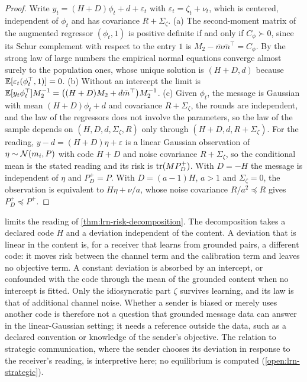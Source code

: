 \begin{proof}
Write $y_t=(H+D)\phi_t+d+\varepsilon_t$ with $\varepsilon_t=\zeta_t+\nu_t$, which is centered, independent of $\phi_t$ and has covariance $R+\Sigma_\zeta$. (a) The second-moment matrix of the augmented regressor $(\phi_t,1)$ is positive definite if and only if $C_\phi\succ0$, since its Schur complement with respect to the entry $1$ is $M_2-\bar m\bar m^\top=C_\phi$. By the strong law of large numbers the empirical normal equations converge almost surely to the population ones, whose unique solution is $(H+D,d)$ because $\mathbb{E}[\varepsilon_t(\phi_t^\top,1)]=0$. (b) Without an intercept the limit is $\mathbb{E}[y_t\phi_t^\top]M_2^{-1}=\bigl((H+D)M_2+d\bar m^\top\bigr)M_2^{-1}$. (c) Given $\phi_t$, the message is Gaussian with mean $(H+D)\phi_t+d$ and covariance $R+\Sigma_\zeta$, the rounds are independent, and the law of the regressors does not involve the parameters, so the law of the sample depends on $(H,D,d,\Sigma_\zeta,R)$ only through $(H+D,d,R+\Sigma_\zeta)$. For the reading, $y-d=(H+D)\eta+\varepsilon$ is a linear Gaussian observation of $\eta\sim\mathcal{N}(m_i,P)$ with code $H+D$ and noise covariance $R+\Sigma_\zeta$, so the conditional mean is the stated reading and its risk is $\operatorname{tr}(MP^+_D)$. With $D=-H$ the message is independent of $\eta$ and $P^+_D=P$. With $D=(a-1)H$, $a>1$ and $\Sigma_\zeta=0$, the observation is equivalent to $H\eta+\nu/a$, whose noise covariance $R/a^2\preceq R$ gives $P^+_D\preceq P^+$.
\end{proof}

\begin{remark}\label{rem:lrn-honest-code}
 limits the reading of \cref{thm:lrn-risk-decomposition}. The decomposition takes a declared code $H$ and a deviation independent of the content. A deviation that is linear in the content is, for a receiver that learns from grounded pairs, a different code: it moves risk between the channel term and the calibration term and leaves no objective term. A constant deviation is absorbed by an intercept, or confounded with the code through the mean of the grounded content when no intercept is fitted. Only the idiosyncratic part $\zeta$ survives learning, and its law is that of additional channel noise. Whether a sender is biased or merely uses another code is therefore not a question that grounded message data can answer in the linear-Gaussian setting; it needs a reference outside the data, such as a declared convention or knowledge of the sender's objective. The relation to strategic communication, where the sender chooses its deviation in response to the receiver's reading, is interpretive here; no equilibrium is computed (\cref{open:lrn-strategic}).
\end{remark}


